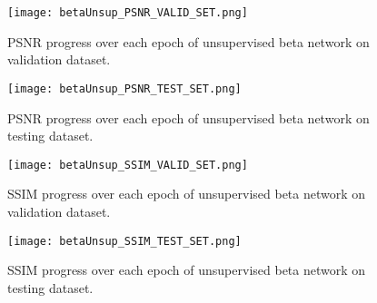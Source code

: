 \begin{figure}[tb] 
\centering 
\texttt{[image: betaUnsup\_PSNR\_VALID\_SET.png]} 
\caption[PSNR validation progress during training of unsupervised beta network]{PSNR progress over each epoch of unsupervised beta network on validation dataset.}
\label{fig:betaUnsupValidPSNR} 
\end{figure}  

\begin{figure}[tb] 
\centering 
\texttt{[image: betaUnsup\_PSNR\_TEST\_SET.png]} 
\caption[PSNR testing progress during training of unsupervised beta network]{PSNR progress over each epoch of unsupervised beta network on testing dataset.}
\label{fig:betaUnsupTestPSNR} 
\end{figure}  

\begin{figure}[tb] 
\centering 
\texttt{[image: betaUnsup\_SSIM\_VALID\_SET.png]} 
\caption[SSIM validation progress during training of unsupervised beta network]{SSIM progress over each epoch of unsupervised beta network on validation dataset.}
\label{fig:betaUnsupValidSSIM} 
\end{figure}  

\begin{figure}[tb] 
\centering 
\texttt{[image: betaUnsup\_SSIM\_TEST\_SET.png]} 
\caption[SSIM testing progress during training of unsupervised beta network]{SSIM progress over each epoch of unsupervised beta network on testing dataset.}
\label{fig:betaUnsupTestSSIM} 
\end{figure}  

\FloatBarrier

